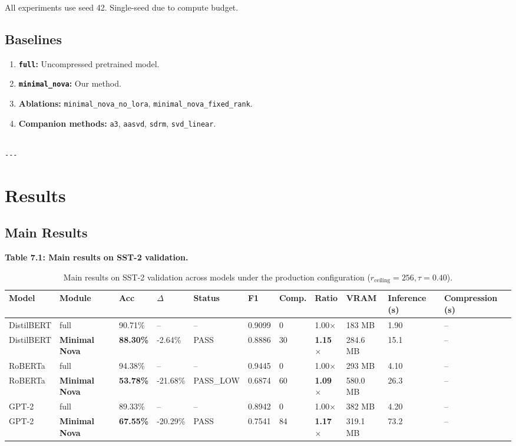 All experiments use seed 42. Single-seed due to compute budget.

\subsection{Baselines}

\begin{enumerate}
\item \textbf{\texttt{full}:} Uncompressed pretrained model.
\item \textbf{\texttt{minimal\_nova}:} Our method.
\item \textbf{Ablations:} \texttt{minimal\_nova\_no\_lora}, \texttt{minimal\_nova\_fixed\_rank}.
\item \textbf{Companion methods:} \texttt{a3}, \texttt{aasvd}, \texttt{sdrm}, \texttt{svd\_linear}.
\end{enumerate}
\begin{lstlisting}

---
\end{lstlisting}


\section{Results}

\subsection{Main Results}

\textbf{Table 7.1: Main results on SST-2 validation.}

\begin{table}[t]
\centering
\small
\begin{tabular}{lllllllllll}
\toprule
\textbf{Model} & \textbf{Module} & \textbf{Acc} & \textbf{$\Delta$} & \textbf{Status} & \textbf{F1} & \textbf{Comp.} & \textbf{Ratio} & \textbf{VRAM} & \textbf{Inference (s)} & \textbf{Compression (s)} \\
\midrule
DistilBERT & full & 90.71\% & -- & -- & 0.9099 & 0 & 1.00$\times$ & 183 MB & 1.90 & -- \\
DistilBERT & \textbf{Minimal Nova} & \textbf{88.30\%} & -2.64\% & PASS & 0.8886 & 30 & \textbf{1.15$\times$} & 284.6 MB & 15.1 & -- \\
RoBERTa & full & 94.38\% & -- & -- & 0.9445 & 0 & 1.00$\times$ & 293 MB & 4.10 & -- \\
RoBERTa & \textbf{Minimal Nova} & \textbf{53.78\%} & -21.68\% & PASS_LOW & 0.6874 & 60 & \textbf{1.09$\times$} & 580.0 MB & 26.3 & -- \\
GPT-2 & full & 89.33\% & -- & -- & 0.8942 & 0 & 1.00$\times$ & 382 MB & 4.20 & -- \\
GPT-2 & \textbf{Minimal Nova} & \textbf{67.55\%} & -20.29\% & PASS & 0.7541 & 84 & \textbf{1.17$\times$} & 319.1 MB & 73.2 & -- \\
\bottomrule
\end{tabular}
\caption{Main results on SST-2 validation across models under the production configuration ($r_{\mathrm{ceiling}}=256, \tau=0.40$).}
\label{tab:main_sst2}
\end{table}

